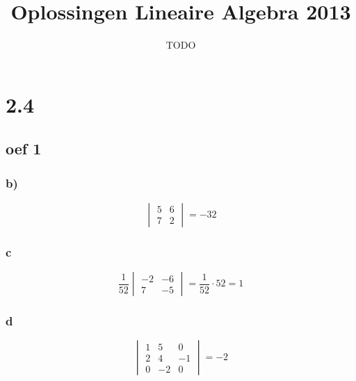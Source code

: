 \documentclass[10pt,a4paper]{article}
\title{Oplossingen Lineaire Algebra 2013}
\author{TODO}
\begin{document}
\maketitle
\pagebreak
\tableofcontents
\pagebreak

\section{2.4}
\subsection*{oef 1}
\subsubsection*{b)}
\[
\begin{vmatrix}
5 & 6\\
7 & 2
\end{vmatrix}
= -32
\]
\subsubsection*{c}
\[
    \frac{1}{52} \begin{vmatrix}
        -2 & -6\\
        7 & -5
    \end{vmatrix} 
    = \frac{1}{52} \cdot 52 = 1
\]
\subsubsection*{d}
\[
\begin{vmatrix}
1 & 5 & 0\\
2 & 4 & -1\\
0 & -2 & 0
\end{vmatrix}
= -2
\]
\end{document}
